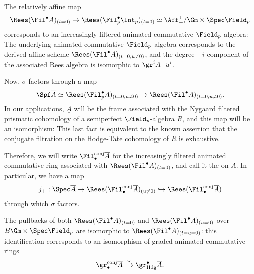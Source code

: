 \documentclass[10pt]{amsart}
\begin{document}
\begin{construction}
\label{const:conj_filt_abstract}
The relatively affine map
\[
\Rees(\Fil^\bullet A)_{(t=0)}\to \Rees(\Fil^\bullet_p\Int_p)_{(t=0)}\simeq \Aff^1_+/\Gm\times\Spec \Field_p
\]
corresponds to an increasingly filtered animated commutative $\Field_p$-algebra: The underlying animated commutative $\Field_p$-algebra corresponds to the derived affine scheme $\Rees(\Fil^\bullet A)_{(t=0,u\neq 0)}$, and the degree $-i$ component of the associated Rees algebra is isomorphic to $\gr^iA\cdot u^i$.

Now, $\sigma$ factors through a map 
\[
\Spf\overline{A}\simeq\Rees(\Fil^\bullet_pA)_{(t=0,u\neq 0)}\to \Rees(\Fil^\bullet A)_{(t=0,u\neq 0)}. 
\]
In our applications, $\underline{A}$ will be the frame associated with the Nygaard filtered prismatic cohomology of a semiperfect $\Field_p$-algebra $R$, and this map will be an isomorphism: This last fact is equivalent to the known assertion that the conjugate filtration on the Hodge-Tate cohomology of $R$ is exhaustive.

Therefore, we will write $\Fil^{\mathrm{conj}}_\bullet \overline{A}$ for the increasingly filtered animated commutative ring associated with $\Rees(\Fil^\bullet A)_{(t=0)}$, and call it the  on $\overline{A}$. In particular, we have a map
\[
j_+:\Spec \overline{A} \to \Rees(\Fil^{\mathrm{conj}}_\bullet\overline{A})_{(u\neq 0)}\hookrightarrow\Rees(\Fil^{\mathrm{conj}}_\bullet \overline{A})
\]
through which $\sigma$ factors.
\end{construction}




\begin{remark}
The pullbacks of both $\Rees(\Fil^\bullet A)_{(t=0)}$ and $\Rees(\Fil^\bullet A)_{(u=0)}$ over $B\Gm\times\Spec\Field_p$ are isomorphic to $\Rees(\Fil^\bullet A)_{(t=u=0)}$: this identification corresponds to an isomorphism of graded animated commutative rings
\[
\gr^{\mathrm{conj}}_\bullet \overline{A}\xrightarrow{\simeq}\gr^{\bullet}_{\mathrm{Hdg}}\overline{A}.
\]
\end{remark}
\end{document}
